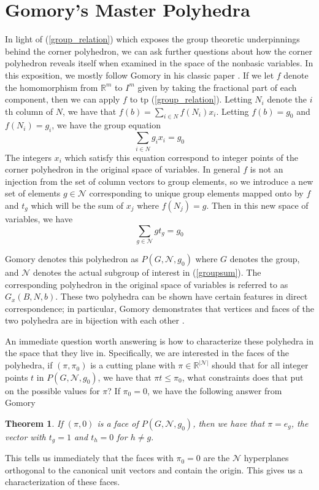 \documentclass{article}
\newtheorem{theorem}{Theorem}
\begin{document}
	\section{Gomory's Master Polyhedra}
	In light of (\ref{group_relation}) which exposes the group theoretic underpinnings behind the corner polyhedron, we can ask further questions about how the corner polyhedron reveals itself when examined in the space of the nonbasic variables. In this exposition, we mostly follow Gomory in his classic paper \cite{gomory1969some}. If we let $f$ denote the homomorphism from $\mathbb{R}^m$ to $I^m$ given by taking the fractional part of each component, then we can apply $f$ to tp (\ref{group_relation}). Letting $N_i$ denote the $i$th column of $N$, we have that $f(b) = \sum_{i \in N}f(N_i)x_i$.
	Letting $f(b) = g_0$ and $f(N_i) = g_i$, we have the group equation
	\begin{equation}
		\sum_{i \in N}g_ix_i = g_0
	\end{equation}
	The integers $x_i$ which satisfy this equation correspond to integer points of the corner polyhedron in the original space of variables. In general $f$ is not an injection from the set of column vectors to group elements, so we introduce a new set of elements $g \in \mathcal{N}$ corresponding to unique group elements mapped onto by $f$ and $t_g$ which will be the sum of $x_j$ where $f(N_j) = g$. Then in this new space of variables, we have
	\begin{equation}
		\sum_{g \in \mathcal{N}}gt_g = g_0	
		\label{groupsum}
	\end{equation}
	
	Gomory denotes this polyhedron as $P(G, \mathcal{N}, g_0)$ where $G$ denotes the group, and $\mathcal{N}$ denotes the actual subgroup of interest in (\ref{groupsum}). The corresponding polyhedron in the original space of variables is referred to as $G_x(B, N, b)$. These two polyhedra can be shown have certain features in direct correspondence; in particular, Gomory demonstrates that vertices and faces of the two polyhedra are in bijection with each other \cite{gomory1969some}.
	
	An immediate question worth answering is how to characterize these polyhedra in the space that they live in. Specifically, we are interested in the faces of the polyhedra, if $(\pi, \pi_0)$ is a cutting plane with $\pi \in \mathbb{R}^{|\mathcal{N}|}$ should that for all integer points $t$ in $P(G, \mathcal{N}, g_0)$, we have that $\pi t \le \pi_0$, what constraints does that put on the possible values for $\pi$?
	If $\pi_0 = 0$, we have the following answer from Gomory \cite{gomory1969some}
	\begin{theorem}
		If $(\pi, 0)$ is a face of $P(G, \mathcal{N}, g_0)$, then we have that $\pi = e_g$, the vector with $t_g = 1$ and $t_h = 0$ for $h \not= g$. 
	\end{theorem}
	This tells us immediately that the faces with $\pi_0 = 0$ are the $\mathcal{N}$ hyperplanes orthogonal to the canonical unit vectors and contain the origin.
	This gives us a characterization of these faces.
	
\end{document}
